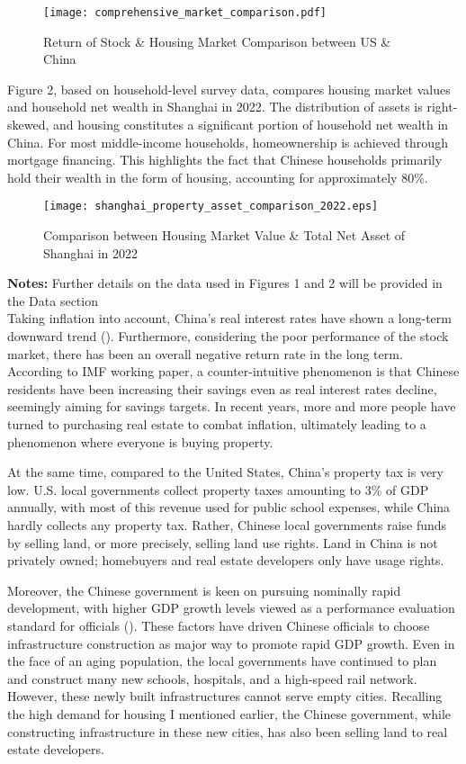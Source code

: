 \documentclass[12pt,english]{article}
\begin{document}
	\begin{figure}[H]
		\centering
		\texttt{[image: comprehensive\_market\_comparison.pdf]}
		\caption{Return of Stock \& Housing Market Comparison between US \& China}
		\label{fig:1_1}
	\end{figure}
	Figure 2, based on household-level survey data, compares housing market values and household net wealth in Shanghai in 2022. The distribution of assets is right-skewed, and housing constitutes a significant portion of household net wealth in China. For most middle-income households, homeownership is achieved through mortgage financing. This highlights the fact that Chinese households primarily hold their wealth in the form of housing, accounting for approximately 80\%.
	\begin{figure}[H]
		\centering
		\texttt{[image: shanghai\_property\_asset\_comparison\_2022.eps]}
		\caption{Comparison between Housing Market Value \& Total Net Asset of Shanghai in 2022}
		\label{fig:1_2}
	\end{figure}
	\noindent\textbf{Notes:} Further details on the data used in Figures 1 and 2 will be provided in the Data section\medskip\\
	
	Taking inflation into account, China's real interest rates have shown a long-term downward trend (\citealp{nabar2011targets}). Furthermore, considering the poor performance of the stock market, there has been an overall negative return rate in the long term. According to \cite{nabar2011targets} IMF working paper, a counter-intuitive phenomenon is that Chinese residents have been increasing their savings even as real interest rates decline, seemingly aiming for savings targets. In recent years, more and more people have turned to purchasing real estate to combat inflation, ultimately leading to a phenomenon where everyone is buying property.
	
	At the same time, compared to the United States, China's property tax is very low. U.S. local governments collect property taxes amounting to 3\% of GDP annually, with most of this revenue used for public school expenses, while China hardly collects any property tax. Rather, Chinese local governments raise funds by selling land, or more precisely, selling land use rights. Land in China is not privately owned; homebuyers and real estate developers only have usage rights.
	
	Moreover, the Chinese government is keen on pursuing nominally rapid development, with higher GDP growth levels viewed as a performance evaluation standard for officials (\citealp{li2019target}). These factors have driven Chinese officials to choose infrastructure construction as major way to promote rapid GDP growth. Even in the face of an aging population, the local governments have continued to plan and construct many new schools, hospitals, and a high-speed rail network. However, these newly built infrastructures cannot serve empty cities. Recalling the high demand for housing I mentioned earlier, the Chinese government, while constructing infrastructure in these new cities, has also been selling land to real estate developers. 
	
\end{document}
